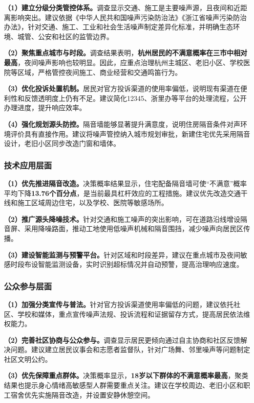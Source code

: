 \textbf{（1）建立分级分类管控体系。}调查显示交通、施工是主要噪声源，且夜间和近距离影响突出。建议依据《中华人民共和国噪声污染防治法》《浙江省噪声污染防治办法》，针对交通、施工、工业和社会生活噪声制定差异化标准，并明确生态环境、城管、公安和社区的监管边界。

\textbf{（2）聚焦重点城市与时段。}调查结果表明，\textbf{杭州居民的不满意概率在三市中相对最高}，夜间噪声影响也较明显。因此，应重点治理杭州主城区、老旧小区、学校医院等区域，严格管控夜间施工、商业经营和交通鸣笛行为。

\textbf{（3）优化投诉处置机制。}居民对官方投诉渠道的使用率偏低，说明现有渠道在便利性和反馈透明度上仍有不足。建议简化12345、浙里办等平台的处理流程，公开办理进度，提升响应效率。

\textbf{（4）强化规划源头防控。}隔音墙能够显著提升满意度，说明住房隔音条件对声环境评价具有直接作用。建议将噪声管控纳入城市规划审批，新建住宅优先采用隔音设计，老旧小区同步改造门窗和墙体。

\subsubsection{技术应用层面}

\textbf{（1）优先推进隔音改造。}决策概率结果显示，住宅配备隔音墙可使“不满意”概率平均下降\textbf{13.76个百分点}，是当前最具杠杆效应的工程措施。建议优先改造交通干线和施工区域周边住宅，以及学校、医院等敏感场所。

\textbf{（2）推广源头降噪技术。}针对交通和施工噪声的突出影响，可在道路沿线增设隔音屏、采用降噪路面，推动工地使用低噪声机械和隔音围挡，减少噪声向居民区传播。

\textbf{（3）建设智能监测与预警平台。}针对区域和时段差异，建议在重点城市及夜间敏感时段布设智能监测设备，实时识别超标情况并自动预警，提高治理响应速度。

\subsubsection{公众参与层面}

\textbf{（1）加强分类宣传与普法。}针对官方投诉渠道使用率偏低的问题，建议依托社区、学校和媒体，重点宣传噪声法规、投诉流程和证据留存方式，提高居民依法维权能力。

\textbf{（2）完善社区协商与公众参与。}调查显示居民更倾向通过自主协商和社区反馈解决问题。建议建立居民议事会和志愿者监督队，针对广场舞、邻里噪声等问题制定社区文明公约。

\textbf{（3）优先保障重点群体。}决策概率显示，\textbf{18岁以下群体的不满意概率最高}，聚类结果也提示身心情绪高敏感型人群需要重点关注。建议在学校周边、老旧小区和职工宿舍优先实施隔音改造，并设置安静休憩空间。

